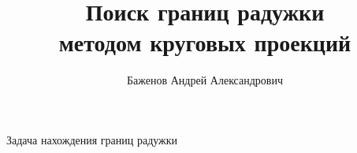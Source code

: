 \documentclass{beamer}
\title{Поиск границ радужки\\ методом круговых проекций}
\author[А.\,А. Баженов]{Баженов Андрей Александрович}
\institute{Московский физико-технический институт}
\date{\footnotesize
\par\smallskip\emph{Курс:} Автоматизация научных исследований\par (практика, В.\,В.~Стрижов)/Группа 821
\par\smallskip\emph{Эксперт:} И.\,А.~Матвеев
\par\smallskip\emph{Консультант:} И.\,А.~Матвеев
\par\bigskip\small 2021}
\begin{document}
\begin{frame}
\thispagestyle{empty}
\maketitle
\end{frame}
\begin{frame}{Задача нахождения границ радужки}


\end{frame}
\end{document}
